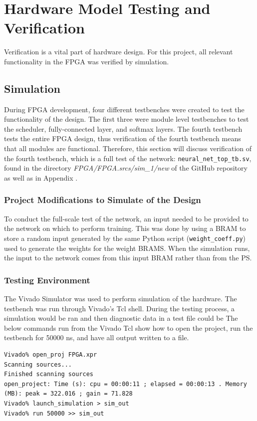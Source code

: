 \chapter{Hardware Model Testing and Verification}
Verification is a vital part of hardware design. For this project, all relevant functionality in the FPGA was verified by simulation.
\section{Simulation}
During FPGA development, four different testbenches were created to test the functionality of the design. The first three were module level testbenches to test the scheduler, fully-connected layer, and softmax layers. The fourth testbench tests the entire FPGA design, thus verification of the fourth testbench means that all modules are functional. Therefore, this section will discuss verification of the fourth testbench, which is a full test of the network: \texttt{neural\_net\_top\_tb.sv}, found in the directory \textit{FPGA/FPGA.srcs/sim\_1/new} of the GitHub repository as well as in Appendix .

\subsection{Project Modifications to Simulate of the Design}
To conduct the full-scale test of the network, an input needed to be provided to the network on which to perform training. This was done by using a BRAM to store a random input generated by the same Python script (\texttt{weight\_coeff.py}) used to generate the weights for the weight BRAMS. When the simulation runs, the input to the network comes from this input BRAM rather than from the PS.

\subsection{Testing Environment}
The Vivado Simulator was used to perform simulation of the hardware. The testbench was run through Vivado's Tcl shell. During the testing process, a simulation would be ran and then diagnostic data in a test file could be  The below commands run from the Vivado Tcl show how to open the project, run the testbench for 50000 ns, and have all output written to a file.
\begin{lstlisting}
Vivado% open_proj FPGA.xpr
Scanning sources...
Finished scanning sources
open_project: Time (s): cpu = 00:00:11 ; elapsed = 00:00:13 . Memory (MB): peak = 322.016 ; gain = 71.828
Vivado% launch_simulation > sim_out
Vivado% run 50000 >> sim_out
\end{lstlisting}

